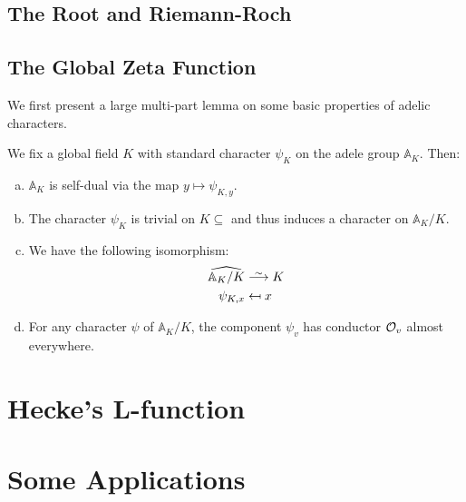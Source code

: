 \documentclass[11pt, x11names, openany]{book}
\renewcommand{\aa}{\mathbb{A}}
\newcommand{\bij}{\stackrel{\sim}{\smash{\longrightarrow}\rule{0pt}{0.5ex}}}
\renewcommand{\hat}{\widehat}
\begin{document}
\subsection{The Root and Riemann-Roch}
\label{subsection: The Root Number}


\subsection{The Global Zeta Function}
\label{subsection: global zeta function}

\begin{defn}
\label{def: adele standard character}

\end{defn}

We first present a large multi-part lemma on some basic properties of adelic characters.
\begin{lemma}
\label{lemma: properties of adelic characters}
We fix a global field $K$ with standard character $\psi_K$ on the adele group $\aa_K$. Then:
\begin{enumerate}[(a)]
    \item \label{thmitem: adele group self-duality} $\aa_K$ is self-dual via the map $y \mapsto \psi_{K, y}$.
    \item \label{thmitem: triviality of adele character on K} The character $\psi_K$ is trivial on $K \subseteq $ and thus induces a character on $\aa_K/K$.
    \item \label{thmitem: duality of A_K/K} We have the following isomorphism:
    \begin{align}
        \label{eqn: A_K/K and K pontryagin duality}
        \hat{\aa_K/K} & \bij K \nonumber \\
        \psi_{K, x} & \mapsfrom x
    \end{align}
    \item \label{thmitem: character has O_v conductor almost everywhere} For any character $\psi$ of $\aa_K/K$, the component $\psi_v$ has conductor $\mathcal{O}_v$ almost everywhere.
\end{enumerate}
\end{lemma}

\section{Hecke's L-function}

\section{Some Applications}
\end{document}
